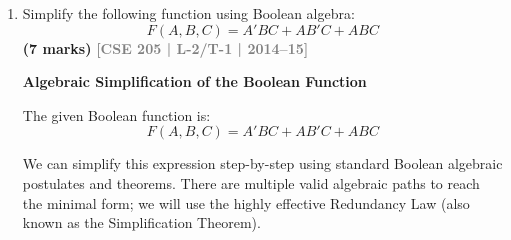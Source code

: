 \documentclass[12pt,a3paper]{article}
\newcommand{\yr}[1]{\hfill\textcolor{gray}{\small\textbf{[#1]}}}
\newcommand{\mk}[1]{\textcolor{orange!70!black}{\small\textbf{(#1 marks)}}}
\begin{document}
\begin{enumerate}
\begin{tcolorbox}[enhanced,breakable,ansbox,colback=cA!4,colframe=cA,boxrule=0.8pt,arc=5pt,title={\textbf{Answer}},fonttitle=\bfseries\color{white},colbacktitle=cA]
\vspace{0.4cm}
\textbf{Proof of the Product of Sums (POS) Form}

Similarly, we can prove the POS form by direct algebraic manipulation.

\begin{align*}
\text{LHS} &= (X + Y)(X' + Z)(Y + Z) \\
\intertext{\textbf{Step 1:} Add $0$ to the consensus term $(Y + Z)$ using the \textbf{Identity Law} ($A + 0 = A$).}
&= (X + Y)(X' + Z)(Y + Z + 0) \\
\intertext{\textbf{Step 2:} Substitute $0$ with $XX'$ using the \textbf{Complement Law} ($A \cdot A' = 0$).}
&= (X + Y)(X' + Z)(Y + Z + XX') \\
\intertext{\textbf{Step 3:} Expand using the \textbf{Distributive Law} ($A + BC = (A + B)(A + C)$).}
&= (X + Y)(X' + Z)(X + Y + Z)(X' + Y + Z) \\
\intertext{\textbf{Step 4:} Rearrange terms using the \textbf{Commutative Law} to pair terms efficiently.}
&= \big[ (X + Y)(X + Y + Z) \big] \cdot \big[ (X' + Z)(X' + Z + Y) \big] \\
\intertext{\textbf{Step 5:} Apply the \textbf{Absorption Law} $A(A + B) = A$. In the first bracketed group, let $A = X+Y$ and $B=Z$. In the second group, let $A = X'+Z$ and $B=Y$.}
&= (X + Y) \cdot (X' + Z) \\
&= \text{RHS}
\end{align*}
\textbf{Thus, the POS form of the Consensus Theorem is also algebraically proven.}

\end{tcolorbox}

\item Simplify the following function using Boolean algebra:
\[ F(A, B, C) = A'BC + AB'C + ABC \]
\mk{7} \yr{CSE 205 | L-2/T-1 | 2014--15}

\begin{tcolorbox}[enhanced,breakable,ansbox,colback=cA!4,colframe=cA,boxrule=0.8pt,arc=5pt,title={\textbf{Answer}},fonttitle=\bfseries\color{white},colbacktitle=cA]

\textbf{Algebraic Simplification of the Boolean Function}

The given Boolean function is:
\[ F(A, B, C) = A'BC + AB'C + ABC \]

We can simplify this expression step-by-step using standard Boolean algebraic postulates and theorems. There are multiple valid algebraic paths to reach the minimal form; we will use the highly effective Redundancy Law (also known as the Simplification Theorem).


\end{tcolorbox}
\end{enumerate}
\end{document}
